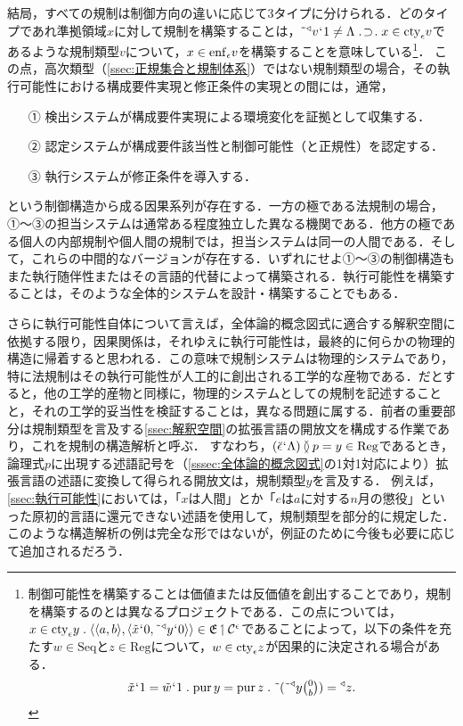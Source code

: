 結局，すべての規制は制御方向の違いに応じて3タイプに分けられる．どのタイプであれ準拠領域$x$に対して規制を構築することは，$ \tildel{\trgl{v}}\fap 1 \neq\Lambda \case{1}{1}{1}x\in\cty{\epsilon}v $であるような規制類型$v$について，$ x\in\mathrm{enf}_{\epsilon}v $を構築することを意味している\footnote{
    制御可能性を構築することは価値または反価値を創出することであり，規制を構築するのとは異なるプロジェクトである．この点については，
    $ x\in\cty{\epsilon}y \con{1} \orp{\orp{a,b},\orp{\tilde{x}\fap 0,\tildel{\trgl{y}}\fap 0}}\in \mathfrak{E}\uphl\mathcal{C}^\epsilon $であることによって，以下の条件を充たす$ w\in\mathrm{Seq} $と$ z\in\mathrm{Reg} $について，$ w\in \mathrm{cty}_{\epsilon}z $が因果的に決定される場合がある．
    \[
        \tilde{x}\fap 1 = \tilde{w}\fap 1\con{1}\mathrm{pur}\,y = \mathrm{pur}\,z\con{1}\tildel{(\tildel{\trgl{y}}\tbinom{0}{b})} = \trgl{z}.
    \]}．
この点，高次類型（\ref{ssec:正規集合と規制体系}）ではない規制類型の場合，その執行可能性における構成要件実現と修正条件の実現との間には，通常，
\begin{enumerate}
    \item[①] 検出システムが構成要件実現による環境変化を証拠として収集する．
    \item[②] 認定システムが構成要件該当性と制御可能性（と正規性）を認定する．
    \item[③] 執行システムが修正条件を導入する．
\end{enumerate}
という制御構造から成る因果系列が存在する．一方の極である法規制の場合，①〜③の担当システムは通常ある程度独立した異なる機関である．他方の極である個人の内部規制や個人間の規制では，担当システムは同一の人間である．そして，これらの中間的なバージョンが存在する．いずれにせよ①〜③の制御構造もまた執行随伴性またはその言語的代替によって構築される．執行可能性を構築することは，そのような全体的システムを設計・構築することでもある．

さらに執行可能性自体について言えば，全体論的概念図式に適合する解釈空間に依拠する限り，因果関係は，それゆえに執行可能性は，最終的に何らかの物理的構造に帰着すると思われる．この意味で規制システムは物理的システムであり，特に法規制はその執行可能性が人工的に創出される工学的な産物である．だとすると，他の工学的産物と同様に，物理的システムとしての規制を記述することと，それの工学的妥当性を検証することは，異なる問題に属する．前者の重要部分は規制類型を言及する\ref{ssec:解釈空間}の拡張言語の開放文を構成する作業であり，これを規制の構造解析と呼ぶ．
すなわち，$ (\breve{\epsilon}{\mspace{1mu}{`}\mspace{1mu}}\Lambda)\mathbin{\between} p = y\in\mathrm{Reg} $であるとき，論理式$p$に出現する述語記号を（\ref{sssec:全体論的概念図式}の1対1対応により）拡張言語の述語に変換して得られる開放文は，規制類型$y$を言及する．
例えば，\ref{ssec:執行可能性}においては，「$x$は人間」とか「$e$は$a$に対する$n$月の懲役」といった原初的言語に還元できない述語を使用して，規制類型を部分的に規定した．このような構造解析の例は完全な形ではないが，例証のために今後も必要に応じて追加されるだろう．

